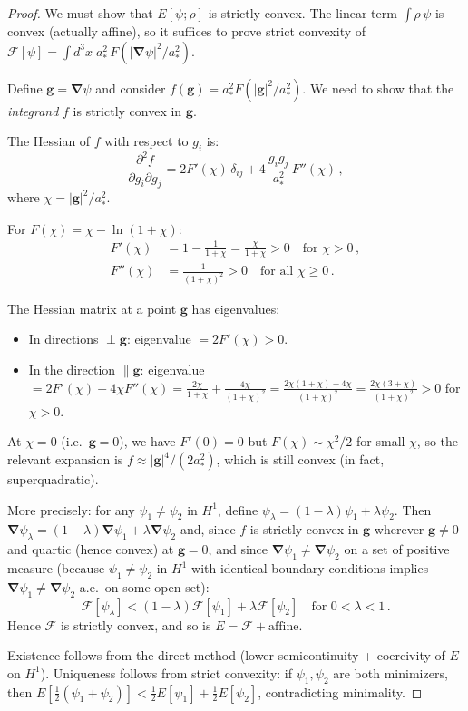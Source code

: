 \documentclass[12pt,a4paper]{article}
\theoremstyle{definition}
\theoremstyle{remark}
\newcommand{\grad}{\boldsymbol{\nabla}}
\begin{document}
\begin{proof}
We must show that $E[\psi;\rho]$ is strictly convex.  The linear term
$\int \rho\,\psi$ is convex (actually affine), so it suffices to prove
strict convexity of
$\mathcal{F}[\psi] = \int d^3x\; a_*^2\, F(|\grad\psi|^2/a_*^2)$.

Define $\mathbf{g} = \grad\psi$ and consider $f(\mathbf{g}) = a_*^2 F(|\mathbf{g}|^2/a_*^2)$.
We need to show that the \emph{integrand} $f$ is strictly convex in $\mathbf{g}$.

The Hessian of $f$ with respect to $g_i$ is:
\begin{equation}
\frac{\partial^2 f}{\partial g_i \partial g_j}
= 2 F'(\chi)\,\delta_{ij} + 4\,\frac{g_i g_j}{a_*^2}\,F''(\chi)\,,
\end{equation}
where $\chi = |\mathbf{g}|^2/a_*^2$.

For $F(\chi) = \chi - \ln(1+\chi)$:
\begin{align}
F'(\chi) &= 1 - \frac{1}{1+\chi} = \frac{\chi}{1+\chi} > 0
\quad\text{for } \chi > 0\,, \\
F''(\chi) &= \frac{1}{(1+\chi)^2} > 0
\quad\text{for all } \chi \geq 0\,.
\end{align}

The Hessian matrix at a point $\mathbf{g}$ has eigenvalues:
\begin{itemize}
\item In directions $\perp \mathbf{g}$: eigenvalue $= 2F'(\chi) > 0$.
\item In the direction $\parallel \mathbf{g}$: eigenvalue
$= 2F'(\chi) + 4\chi F''(\chi)
= \frac{2\chi}{1+\chi} + \frac{4\chi}{(1+\chi)^2}
= \frac{2\chi(1+\chi) + 4\chi}{(1+\chi)^2}
= \frac{2\chi(3+\chi)}{(1+\chi)^2} > 0$ for $\chi > 0$.
\end{itemize}

At $\chi = 0$ (i.e.\ $\mathbf{g} = 0$), we have $F'(0) = 0$ but
$F(\chi) \sim \chi^2/2$ for small $\chi$, so the relevant expansion is
$f \approx |\mathbf{g}|^4/(2a_*^2)$, which is still convex (in fact,
superquadratic).

More precisely: for any $\psi_1 \neq \psi_2$ in $H^1$, define
$\psi_\lambda = (1-\lambda)\psi_1 + \lambda\psi_2$.  Then
$\grad\psi_\lambda = (1-\lambda)\grad\psi_1 + \lambda\grad\psi_2$ and,
since $f$ is strictly convex in $\mathbf{g}$ wherever $\mathbf{g}\neq 0$
and quartic (hence convex) at $\mathbf{g} = 0$, and since $\grad\psi_1 \neq \grad\psi_2$
on a set of positive measure (because $\psi_1 \neq \psi_2$ in $H^1$ with
identical boundary conditions implies $\grad\psi_1 \neq \grad\psi_2$ a.e.\ on
some open set):
\[
\mathcal{F}[\psi_\lambda] < (1-\lambda)\mathcal{F}[\psi_1] + \lambda\mathcal{F}[\psi_2]
\quad\text{for } 0 < \lambda < 1\,.
\]
Hence $\mathcal{F}$ is strictly convex, and so is $E = \mathcal{F} + \text{affine}$.

Existence follows from the direct method (lower semicontinuity + coercivity
of $E$ on $H^1$).  Uniqueness follows from strict convexity: if $\psi_1, \psi_2$
are both minimizers, then $E[\frac{1}{2}(\psi_1+\psi_2)] < \frac{1}{2}E[\psi_1] + \frac{1}{2}E[\psi_2]$,
contradicting minimality.
\end{proof}
\end{document}
